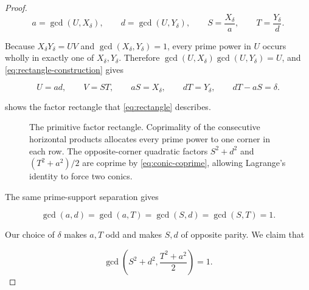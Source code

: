 \begin{proof}
\begin{equation}
 a=\gcd(U,X_\delta),
 \qquad
 d=\gcd(U,Y_\delta),
 \qquad
 S=\frac{X_\delta}{a},
 \qquad
 T=\frac{Y_\delta}{d}.
 \label{eq:rectangle-construction}
\end{equation}

Because $X_\delta Y_\delta=UV$ and
$\gcd(X_\delta,Y_\delta)=1$, every prime power in $U$ occurs wholly in
exactly one of $X_\delta,Y_\delta$. Therefore
$\gcd(U,X_\delta)\gcd(U,Y_\delta)=U$, and
\cref{eq:rectangle-construction} gives

\begin{equation}
 U=ad,
 \qquad
 V=ST,
 \qquad
 aS=X_\delta,
 \qquad
 dT=Y_\delta,
 \qquad
 dT-aS=\delta.
\label{eq:rectangle}
\end{equation}

 shows the factor rectangle that
\cref{eq:rectangle} describes.

\begin{figure}[t]
\centering
{}
\caption{The primitive factor rectangle. Coprimality of the consecutive
horizontal products allocates every prime power to one corner in each row.
The opposite-corner quadratic factors $S^2+d^2$ and
$(T^2+a^2)/2$ are coprime by \cref{eq:conic-coprime}, allowing Lagrange's
identity to force two conics.}
\label{fig:primitive-rectangle}
\end{figure}

The same prime-support separation gives

\begin{equation}
 \gcd(a,d)=\gcd(a,T)=\gcd(S,d)=\gcd(S,T)=1.
 \label{eq:rectangle-cross-coprime}
\end{equation}

Our choice of $\delta$ makes $a,T$ odd and makes $S,d$ of opposite parity.
We claim that

\begin{equation}
 \gcd\left(S^2+d^2,\frac{T^2+a^2}{2}\right)=1.
 \label{eq:conic-coprime}
\end{equation}


\end{proof}
